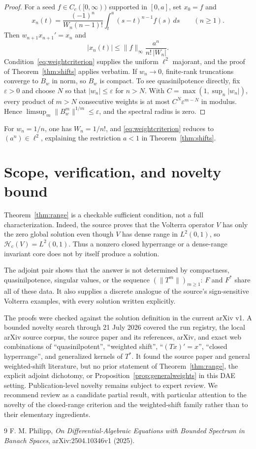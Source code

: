\documentclass[11pt]{article}
\newcommand{\Hc}{\mathcal H_{\mathrm c}}
\begin{document}
\begin{proof}
For a seed $f\in C_c([0,\infty))$ supported in $[0,a]$, set $x_0=f$ and
\[
 x_n(t)=\frac{(-1)^n}{W_n(n-1)!}
          \int_t^a(s-t)^{n-1}f(s)\,ds\qquad(n\geq1).
\]
Then $w_{n+1}x_{n+1}'=x_n$ and
\[
 |x_n(t)|\leq \|f\|_\infty
          \frac{a^n}{n!\,|W_n|}.
\]
Condition~\eqref{eq:weightcriterion} supplies the uniform $\ell^2$ majorant,
and the proof of Theorem~\ref{thm:shifts} applies verbatim.  If $w_n\to0$,
finite-rank truncations converge to $B_w$ in norm, so $B_w$ is compact.  To
see quasinilpotence directly, fix $\varepsilon>0$ and choose $N$ so that
$|w_n|\leq\varepsilon$ for $n>N$.  With
$C=\max(1,\sup_n|w_n|)$, every product of $m>N$ consecutive weights is at
most $C^N\varepsilon^{m-N}$ in modulus.  Hence
$\limsup_m\|B_w^m\|^{1/m}\leq\varepsilon$, and the spectral radius is zero.
\end{proof}

For $w_n=1/n$, one has $W_n=1/n!$, and
\eqref{eq:weightcriterion} reduces to $(a^n)\in\ell^2$, explaining the
restriction $a<1$ in Theorem~\ref{thm:shifts}.

\section{Scope, verification, and novelty bound}

Theorem~\ref{thm:range} is a checkable sufficient condition, not a full
characterization.  Indeed, the source proves that the Volterra operator $V$
has only the zero global solution even though $V$ has dense range in
$L^2(0,1)$, so $\Hc(V)=L^2(0,1)$.  Thus a nonzero closed hyperrange or a
dense-range invariant core does not by itself produce a solution.

The adjoint pair shows that the answer is not determined by compactness,
quasinilpotence, singular values, or the sequence $(\|T^m\|)_{m\geq1}$:
$F$ and $F^*$ share all of these data.  It also supplies a discrete analogue
of the source's sign-sensitive Volterra examples, with every solution written
explicitly.

The proofs were checked against the solution definition in the current arXiv
v1.  A bounded novelty search through 21 July 2026 covered the run registry,
the local arXiv source corpus, the source paper and its references, arXiv, and
exact web combinations of ``quasinilpotent'', ``weighted shift'',
``$(Tx)'=x$'', ``closed hyperrange'', and generalized kernels of $T^*$.
It found the source paper and general weighted-shift literature, but no prior
statement of Theorem~\ref{thm:range}, the explicit adjoint dichotomy, or
Proposition~\ref{prop:generalweights} in this DAE setting.  Publication-level
novelty remains subject to expert review.  We recommend review as a candidate
partial result, with particular attention to the novelty of the closed-range
criterion and the weighted-shift family rather than to their elementary
ingredients.

\begin{thebibliography}{9}
F. M. Philipp,
\emph{On Differential-Algebraic Equations with Bounded Spectrum in Banach
Spaces}, arXiv:2504.10346v1 (2025).
\end{thebibliography}
\end{document}
